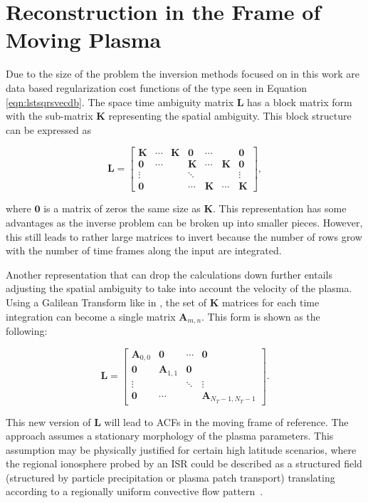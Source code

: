 \section{Reconstruction in the Frame of Moving Plasma}
\label{sec:isralg}
Due to the size of the problem the inversion methods focused on in this work are data based regularization cost functions of the type seen in Equation \ref{eqn:lstsqrsvecdb}. The space time ambiguity matrix $\mathbf{L}$ has a block matrix form with the sub-matrix $\mathbf{K}$ representing the spatial ambiguity. This block structure can be expressed as

\begin{equation}
\label{eqn:kmat}
\mathbf{L}= \begin{bmatrix}\mathbf{K}&\cdots&\mathbf{K}&\mathbf{0}&\cdots&&\mathbf{0}\\
\mathbf{0}&\cdots&&\mathbf{K}&\cdots&\mathbf{K}&\mathbf{0}\\
\vdots&&&\ddots&&&\vdots\\
\mathbf{0}&&&\cdots&\mathbf{K}&\cdots&\mathbf{K}
\end{bmatrix},
\end{equation}

\noindent where $\mathbf{0}$ is a matrix of zeros the same size as $\mathbf{K}$. This representation has some advantages as the inverse problem can be broken up into smaller pieces. However, this still leads to rather large matrices to invert because the number of rows grow with the number of time frames along the input are integrated. 

Another representation that can drop the calculations down further entails adjusting the spatial ambiguity to take into account the velocity of the plasma. Using a Galilean Transform like in \citet{RDS:RDS20236}, the set of $\mathbf{K}$ matrices for each time integration can become a single matrix $\mathbf{A}_{m,n}$. This form is shown as the following:

\begin{equation}
\label{eqn:amat}
\mathbf{L}= \begin{bmatrix}
\mathbf{A}_{0,0}&\mathbf{0}&\cdots&\mathbf{0}\\
 \mathbf{0}&\mathbf{A}_{1,1}&\mathbf{0}&\\
 \vdots&&\ddots&\vdots\\
 \mathbf{0}&\cdots&&\mathbf{A}_{N_T-1,N_T-1}
\end{bmatrix}.
\end{equation}

\noindent This new version of $\mathbf{L}$ will lead to ACFs in the moving frame of reference. The approach assumes a stationary morphology of the plasma parameters. This assumption may be physically justified for certain high latitude scenarios, where the regional ionosphere probed by an ISR could be described as a structured field (structured by particle precipitation or plasma patch transport) translating according to a regionally uniform convective flow pattern~\citep{Tsunoda:1988ul}.

